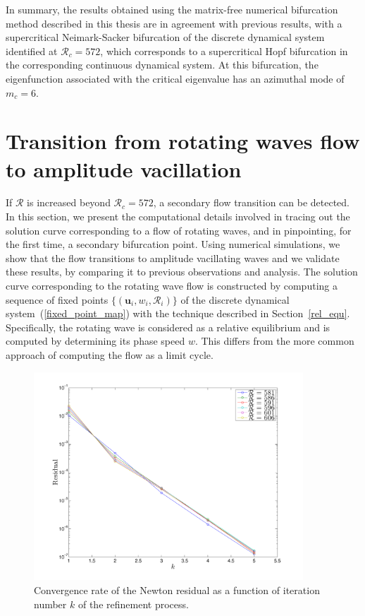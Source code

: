 In summary, the results obtained using the matrix-free numerical bifurcation method described in this thesis are in agreement with previous results, with a supercritical Neimark-Sacker bifurcation of the discrete dynamical system identified at $\mathcal{R}_c = 572$, which corresponds to a supercritical Hopf bifurcation in the corresponding continuous dynamical system. At this bifurcation, the eigenfunction associated with the critical eigenvalue has an azimuthal mode of $m_c = 6$.


\section{Transition from rotating waves flow to amplitude vacillation}\label{sec_rot2ampv}
If $\mathcal{R}$ is increased beyond $\mathcal{R}_c = 572$, a secondary flow transition can be detected. In this section, we present the computational details involved in tracing out the solution curve corresponding to a flow of rotating waves, and in pinpointing, for the first time, a secondary bifurcation point. Using numerical simulations, we show that the flow transitions to amplitude vacillating waves and we validate these results, by comparing it to previous observations and analysis.
The solution curve corresponding to the rotating wave flow is constructed by computing a sequence of fixed points $\{(\mathbf{u}_i,w_i,\mathcal{R}_i)\}$ of the discrete dynamical system~(\ref{fixed_point_map}) with the technique described in Section~\ref{rel_equ}. Specifically, the rotating wave is considered as a relative equilibrium and is computed by determining its phase speed $w$. This differs from the more common approach of computing the flow as a limit cycle.
\begin{figure}[t]
\centerline{\includegraphics[width = 0.9\textwidth]{./figures/Pictures/Newton_residual}}
\caption{Convergence rate of the Newton residual as a function of iteration number $k$ of the refinement process. }
\label{New_conv}
\end{figure}

